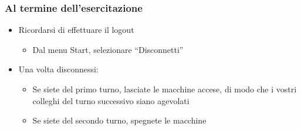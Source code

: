 \documentclass{beamer}
\begin{document}

\begin{frame}
\frametitle{Al termine dell'esercitazione}
\begin{itemize}
 \item Ricordarsi di effettuare il logout
  \begin{itemize}
    \item Dal menu Start, selezionare ``Disconnetti''
  \end{itemize}
 \item Una volta disconnessi:
  \begin{itemize}
    \item Se siete del primo turno, lasciate le macchine accese, di modo che i vostri colleghi del turno successivo siano agevolati
    \item Se siete del secondo turno, spegnete le macchine
  \end{itemize}
\end{itemize}
\end{frame}
\end{document}
